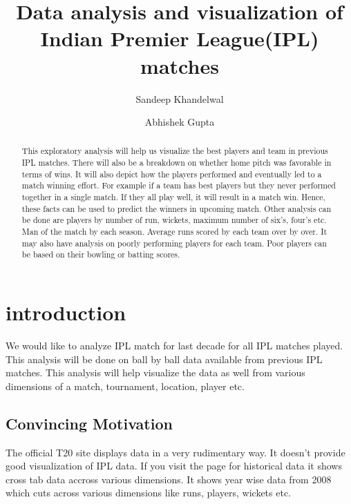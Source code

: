 \documentclass[sigconf]{acmart}
\begin{document}
\title{Data analysis and visualization of Indian Premier League(IPL) matches}

\author{Sandeep Khandelwal}

\author{Abhishek Gupta}

\begin{abstract}

This exploratory analysis will help us visualize the best players and team in previous
IPL matches. There will also be a breakdown on whether
home pitch was favorable in terms of wins. It will also depict how the players 
performed and eventually led to a match winning effort. For example if 
a team has best players but they never performed together in a single match.
If they all play well, it will result in a match win. Hence, these facts can be used to
predict the winners in upcoming match. Other analysis can be done are players by
number of run, wickets, maximum number of six's, four's etc. Man of the match
by each season. Average runs scored by each team over by over. It may also
have analysis on poorly performing players for each team. Poor players 
can be based on their bowling or batting scores. 
   
\end{abstract}


\maketitle

\section{introduction}
We would like to analyze IPL match for last decade for all IPL matches played. This analysis
will be done on ball by ball data available from previous IPL matches. This analysis will help 
visualize the data as well from various dimensions of a match, tournament, location, player etc.

\subsection{Convincing Motivation}
The official T20 \cite{www-iplt20} site displays data in a very rudimentary way. It doesn't
provide good visualization of IPL data. If you visit the page for historical data it shows
cross tab data accross various dimensions. It shows year wise data from 2008 which cuts
across various dimensions like runs, players, wickets etc. 
\end{document}
